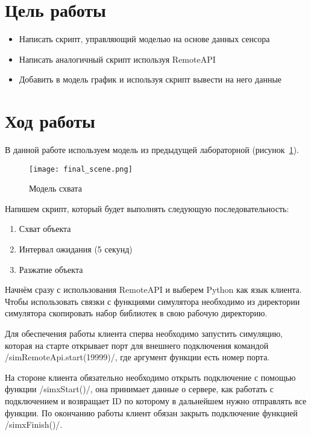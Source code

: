 \documentclass[14pt]{extarticle}
\begin{document}
    

    \section*{Цель работы}
    \begin{itemize}
        \item Написать скрипт, управляющий моделью на основе данных сенсора
        \item Написать аналогичный скрипт используя RemoteAPI
        \item Добавить в модель график и используя скрипт вывести на него данные
    \end{itemize}

    \section*{Ход работы}

    В данной работе используем модель из предыдущей лабораторной (рисунок~\ref{pic:L1 gripper}).
    \begin{figure}[H]
        \centering
        \texttt{[image: final\_scene.png]}
        \caption{Модель схвата}
        \label{pic:L1 gripper}
    \end{figure}

    Напишем скрипт, который будет выполнять следующую последовательность:
    \begin{enumerate}
        \item Схват объекта
        \item Интервал ожидания (5 секунд)
        \item Разжатие объекта
    \end{enumerate}

    Начнём сразу с использования RemoteAPI и выберем Python как язык клиента. Чтобы использовать
    связки с функциями симулятора необходимо из директории симулятора скопировать набор библиотек в свою
    рабочую директорию.

    \sloppy Для обеспечения работы клиента сперва необходимо запустить симуляцию, которая на старте открывает порт
    для внешнего подключения командой \luainline/simRemoteApi.start(19999)/, где аргумент функции есть номер порта.

    На стороне клиента обязательно необходимо открыть подключение с помощью функции \pythoninline/simxStart()/, она
    принимает данные о сервере, как работать с подключением и возвращает ID по которому в дальнейшем нужно отправлять
    все функции. По окончанию работы клиент обязан закрыть подключение функцией \pythoninline/simxFinish()/.
\end{document}
